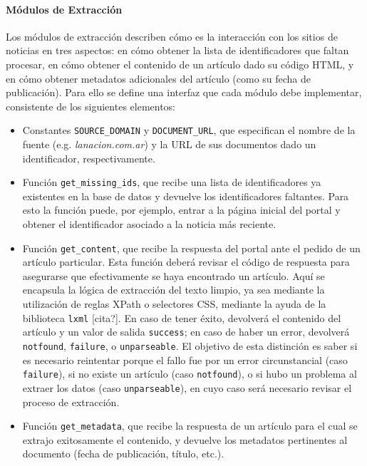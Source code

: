 \paragraph{Módulos de Extracción}

Los módulos de extracción describen cómo es la interacción con los sitios de noticias en tres
aspectos: en cómo obtener la lista de identificadores que faltan procesar, en cómo obtener el
contenido de un artículo dado su código HTML, y en cómo obtener metadatos adicionales del artículo
(como su fecha de publicación). Para ello se define una interfaz que cada módulo debe implementar,
consistente de los siguientes elementos:

\begin{itemize}

\item Constantes \texttt{SOURCE\_DOMAIN} y \texttt{DOCUMENT\_URL}, que especifican el nombre de la
fuente (e.g. \textit{lanacion.com.ar}) y la URL de sus documentos dado un identificador,
respectivamente.

\item Función \texttt{get\_missing\_ids}, que recibe una lista de identificadores ya existentes en la
base de datos y devuelve los identificadores faltantes. Para esto la función puede, por ejemplo,
entrar a la página inicial del portal y obtener el identificador asociado a la noticia más reciente.

\item Función \texttt{get\_content}, que recibe la respuesta del portal ante el pedido de un artículo
particular. Esta función deberá revisar el código de respuesta para asegurarse que efectivamente se
haya encontrado un artículo. Aquí se encapsula la lógica de extracción del texto limpio, ya sea
mediante la utilización de reglas XPath o selectores CSS, mediante la ayuda de la biblioteca
\texttt{lxml} [cita?]. En caso de tener éxito, devolverá el contenido del artículo y un valor de
salida \texttt{success}; en caso de haber un error, devolverá \texttt{notfound}, \texttt{failure}, o
\texttt{unparseable}. El objetivo de esta distinción es saber si es necesario reintentar porque el
fallo fue por un error circunstancial (caso \texttt{failure}), si no existe un artículo (caso
\texttt{notfound}), o si hubo un problema al extraer los datos (caso \texttt{unparseable}), en cuyo
caso será necesario revisar el proceso de extracción.

\item Función \texttt{get\_metadata}, que recibe la respuesta de un artículo para el cual se extrajo
exitosamente el contenido, y devuelve los metadatos pertinentes al documento (fecha de publicación,
título, etc.).

\end{itemize}

